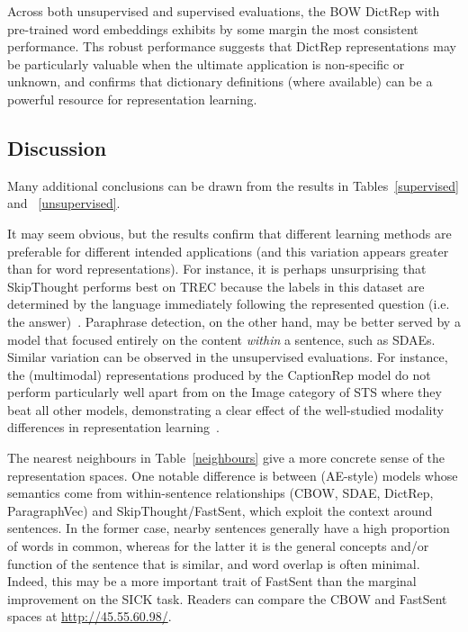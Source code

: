 Across both unsupervised and supervised evaluations, the BOW DictRep with pre-trained word embeddings exhibits by some margin the most consistent performance. Ths robust performance suggests that DictRep representations may be particularly valuable when the ultimate application is non-specific or unknown, and confirms that dictionary definitions (where available) can be a powerful resource for representation learning.  

\subsection{Discussion}


Many additional conclusions can be drawn from the results in Tables~\ref{supervised} and ~\ref{unsupervised}. 

\vspace{5pt} It may seem obvious, but the results confirm that different learning methods are preferable for different intended applications (and this variation appears greater than for word representations). For instance, it is perhaps unsurprising that SkipThought performs best on TREC because the labels in this dataset are determined by the language immediately following the represented question (i.e. the answer)~\cite{voorhees2002overview}. Paraphrase detection, on the other hand, may be better served by a model that focused entirely on the content \emph{within} a sentence, such as SDAEs. Similar variation can be observed in the unsupervised evaluations. For instance, the (multimodal) representations produced by the CaptionRep model do not perform particularly well apart from on the Image category of STS where they beat all other models, demonstrating a clear effect of the well-studied modality differences in representation learning~\cite{bruni2014multimodal}. 

The nearest neighbours in Table~\ref{neighbours} give a more concrete sense of the representation spaces. One notable difference is between (AE-style) models whose semantics come from within-sentence relationships (CBOW, SDAE, DictRep, ParagraphVec) and SkipThought/FastSent, which exploit the context around sentences. In the former case, nearby sentences generally have a high proportion of words in common, whereas for the latter it is the general concepts and/or function of the sentence that is similar, and word overlap is often minimal. Indeed, this may be a more important trait of FastSent than the marginal improvement on the SICK task. Readers can compare the CBOW and FastSent spaces at \url{http://45.55.60.98/}.

